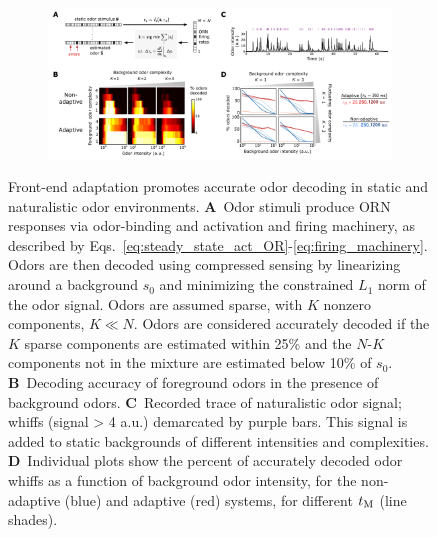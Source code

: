 \documentclass[9pt,twocolumn,twoside]{pnas-new}
\begin{document}
\begin{figure}[t]
	\centering
	\begin{subfigure}[t]{17.7cm}
		\includegraphics[width=17.7cm]{figures/3_decoding_temporal}
		\label{fig:decoding_a}
	\end{subfigure}
	\begin{subfigure}[t]{0\linewidth}
		\label{fig:decoding_b}
	\end{subfigure}
	\begin{subfigure}[t]{0\linewidth}
		\label{fig:decoding_c}
	\end{subfigure}
	\begin{subfigure}[t]{0\linewidth}
		\label{fig:decoding_d}
	\end{subfigure}
	\begin{subfigure}[t]{0\linewidth}
		\label{fig:decoding_e}
	\end{subfigure}
	\caption{\footnotesize{Front-end adaptation promotes accurate odor decoding in static and naturalistic odor environments.
    \textbf{A}~Odor stimuli produce ORN responses via odor-binding and activation and firing machinery, as described by Eqs.~\ref{eq:steady_state_act_OR}-\ref{eq:firing_machinery}. Odors are then decoded using compressed sensing by linearizing around a background $s_0$ and minimizing the constrained $L_1$ norm of the odor signal.  Odors are assumed sparse, with $K$ nonzero components, $K \ll N$. Odors are considered accurately decoded if the $K$ sparse components are estimated within 25\% and the $N$-$K$ components not in the mixture are estimated below 10\% of $s_0$.
    \textbf{B}~Decoding accuracy of foreground odors in the presence of background odors. 
    \textbf{C}~Recorded trace of naturalistic odor signal; whiffs (signal > 4 a.u.) demarcated by purple bars. This signal is added to static backgrounds of different intensities and complexities.
    \textbf{D}~Individual plots show the percent of accurately decoded odor whiffs as a function of background odor intensity, for the non-adaptive (blue) and adaptive (red) systems, for different $t_{\textup M}$ (line shades). 
    }}
	\label{fig:decoding}
\end{figure}
\end{document}

